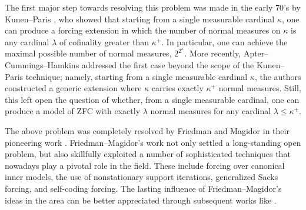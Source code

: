 \documentclass[11pt]{amsart}
\theoremstyle{definition}
\theoremstyle{remark}
\newcommand\<{{<}}
\begin{document}


The first major step towards resolving this problem was made in the early 70's by Kunen--Paris \cite{KunenParis}, who showed that starting from a single measurable cardinal $\kappa$, one can produce a forcing extension in which the number of normal measures on $\kappa$ is any cardinal $\lambda$ of cofinality greater than $\kappa^+$. In particular, one can achieve the maximal possible number of normal measures, $2^{2^\kappa}$. More recently, Apter--Cummings--Hamkins \cite{ApterCummingsHamkins} addressed the first case beyond the scope of the Kunen--Paris technique; namely, starting from a single measurable cardinal $\kappa$, the authors constructed a generic extension where  $\kappa$ carries exactly $\kappa^+$ normal measures.  Still, this left open the question of whether, from a single measurable cardinal, one can produce a model of ZFC with exactly $\lambda$ normal measures for any cardinal $\lambda \leq \kappa^+$. 

The above problem was completely resolved by Friedman and Magidor in their pioneering work \cite{FriedmanMagidor}. Friedman--Magidor's work not only settled a long-standing open problem, but also skillfully exploited a number of sophisticated techniques that nowadays play a pivotal role in the field. These include forcing over canonical inner models, the use of nonstationary support iterations, generalized Sacks forcing, and self-coding forcing. The lasting influence of Friedman--Magidor's ideas in the area can be better appreciated through   subsequent works like \cite{BenNeriaII, BenNeriaI, BenNeriaUnger, BenNeriaGitik, ApterCummingsTall, HP, aptercummings2023normalmeasuresonlargecards, GitikKaplan, BenNeriaKaplan, HP2}.
\end{document}
